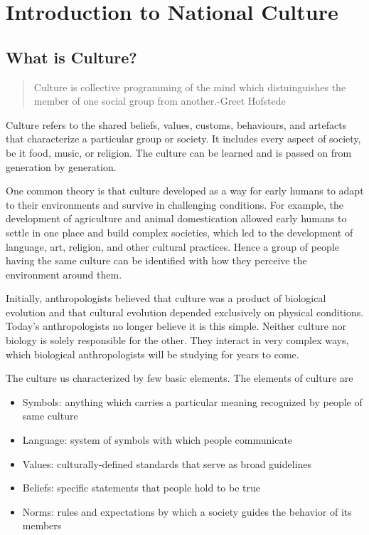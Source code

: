 \documentclass{article}
\begin{document}
\newpage
\tableofcontents
\newpage
\listoffigures
\newpage
\listoftables

\newpage
\section{Introduction to National Culture}
\subsection{What is Culture?}
\begin{quote}
    Culture is collective programming of the mind which distuinguishes the member of one social group from another.\hfill -Greet Hofstede
\end{quote}

Culture refers to the shared beliefs, values, customs, behaviours, and artefacts that characterize a particular group or society. It includes every aspect of society, be it food, music, or religion. The culture can be learned and is passed on from generation by generation.

One common theory is that culture developed as a way for early humans to adapt to their environments and survive in challenging conditions. For example, the development of agriculture and animal domestication allowed early humans to settle in one place and build complex societies, which led to the development of language, art, religion, and other cultural practices. Hence a group of people having the same culture can be identified with how they perceive the environment around them.

Initially, anthropologists believed that culture was a product of biological evolution and that cultural evolution depended exclusively on physical conditions. Today’s anthropologists no longer believe it is this simple. Neither culture nor biology is solely responsible for the other. They interact in very complex ways, which biological anthropologists will be studying for years to come.

The culture us characterized by few basic elements. The elements of culture are
\begin{itemize}
    \item Symbols: anything which carries a particular meaning recognized by people of same culture
    \item Language: system of symbols with which people communicate
    \item Values: culturally-defined standards that serve as broad guidelines
    \item Beliefs: specific statements that people hold to be true
    \item Norms: rules and expectations by which a society guides the behavior of its members
\end{itemize}
\end{document}
